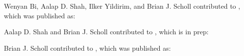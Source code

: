 

\begin{BibliographyEnv}

Wenyan Bi, Aalap D. Shah, Ilker Yildirim, and Brian J. Scholl contributed to , which was published as:

\begin{refsection}
    \nocite{wong_seeing_2023}
    \printbibliography[heading=none, title={}]
\end{refsection}

\noindent Aalap D. Shah and Brian J. Scholl contributed to , which is in prep:

\begin{refsection}
    \nocite{wong_seeing_nodate}
    \printbibliography[heading=none, title={}]
\end{refsection}

\noindent Brian J. Scholl contributed to , which was published as:

\begin{refsection}
    \nocite{wong_spontaneous_2024}
    \printbibliography[heading=none, title={}]
\end{refsection}

\end{BibliographyEnv}








